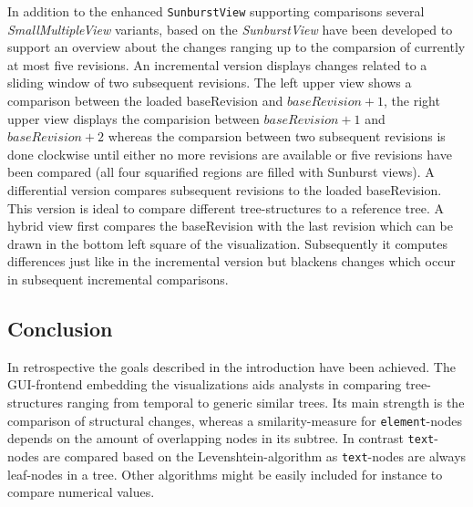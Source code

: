 In addition to the enhanced \texttt{SunburstView} supporting comparisons several \emph{SmallMultipleView} variants, based on the \emph{SunburstView} have been developed to support an overview about the changes ranging up to the comparsion of currently at most five revisions. An incremental version displays changes related to a sliding window of two subsequent revisions. The left upper view shows a comparison between the loaded baseRevision and $baseRevision + 1$, the right upper view displays the comparision between $baseRevision + 1$ and $baseRevision + 2$ whereas the comparsion between two subsequent revisions is done clockwise until either no more revisions are available or five revisions have been compared (all four squarified regions are filled with Sunburst views). A differential version compares subsequent revisions to the loaded baseRevision. This version is ideal to compare different tree-structures to a reference tree. A hybrid view first compares the baseRevision with the last revision which can be drawn in the bottom left square of the visualization. Subsequently it computes differences just like in the incremental version but blackens changes which occur in subsequent incremental comparisons.

\subsection{Conclusion}
In retrospective the goals described in the introduction have been achieved. The GUI-frontend embedding the visualizations aids analysts in comparing tree-structures ranging from temporal to generic similar trees. Its main strength is the comparison of structural changes, whereas a smilarity-measure for \texttt{element}-nodes depends on the amount of overlapping nodes in its subtree. In contrast \texttt{text}-nodes are compared based on the Levenshtein-algorithm as \texttt{text}-nodes are always leaf-nodes in a tree. Other algorithms might be easily included for instance to compare numerical values.

